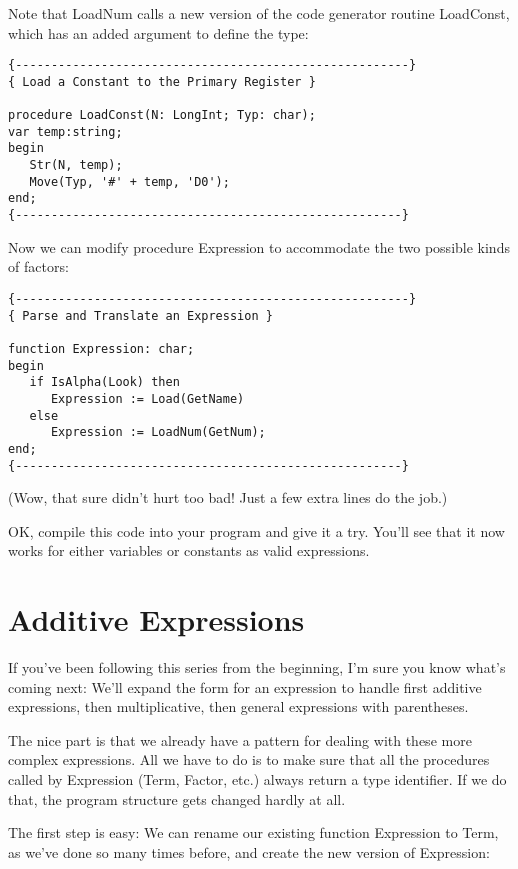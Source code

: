 Note  that  LoadNum  calls  a  new version of the code  generator routine  LoadConst, which has an added  argument  to  define  the type:

\begin{verbatim}
{-------------------------------------------------------}
{ Load a Constant to the Primary Register }

procedure LoadConst(N: LongInt; Typ: char);
var temp:string;
begin
   Str(N, temp);
   Move(Typ, '#' + temp, 'D0');
end;
{------------------------------------------------------}
\end{verbatim}

Now  we can modify procedure Expression  to  accommodate  the  two possible kinds of factors:

\begin{verbatim}
{-------------------------------------------------------}
{ Parse and Translate an Expression }

function Expression: char;
begin
   if IsAlpha(Look) then
      Expression := Load(GetName)
   else
      Expression := LoadNum(GetNum);
end;
{------------------------------------------------------}
\end{verbatim}

(Wow, that sure didn't hurt too bad!  Just a  few  extra lines do the job.)

OK, compile  this code into your program  and  give  it  a  try. You'll see that it now works for either variables or constants as valid expressions.

\section{Additive Expressions}

If you've been following this series from the beginning, I'm sure you  know  what's coming next:  We'll  expand  the  form  for  an expression   to   handle   first   additive   expressions, then multiplicative, then general expressions with parentheses.

The nice part is that we already have a pattern for  dealing with these more complex expressions. All we have  to  do  is  to make sure that  all the procedures called by Expression (Term, Factor, etc.)  always  return a type identifier. If  we  do  that, the program structure gets changed hardly at all.

The  first  step  is  easy:  We can rename our existing  function Expression  to  Term, as  we've  done so many times before, and create the new version of Expression:

